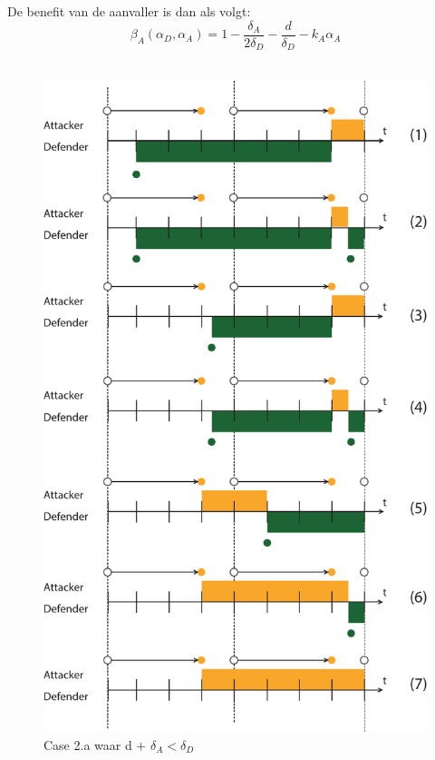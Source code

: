 \documentclass[master=cws, masteroption=vs,english]{kulemt}
\begin{document}
\begin{abstract*}
De benefit van de aanvaller is dan als volgt:
\begin{equation}\label{first}
\beta_{A}(\alpha_{D},\alpha_{A}) = 1 -\dfrac{\delta_{A}}{2\delta_{D}} - \dfrac{d}{\delta_{D}} - k_{A} \alpha_{A} 
\end{equation}\\

\begin{figure}[hbtp]
\centering
\includegraphics[scale=0.5]{../../doc/template/Images/FlipIt2}
\caption{Case 2.a waar d + $\delta_{A} < \delta_{D}$}
\label{fig:case2}
\end{figure}



\end{abstract*}
\end{document}
